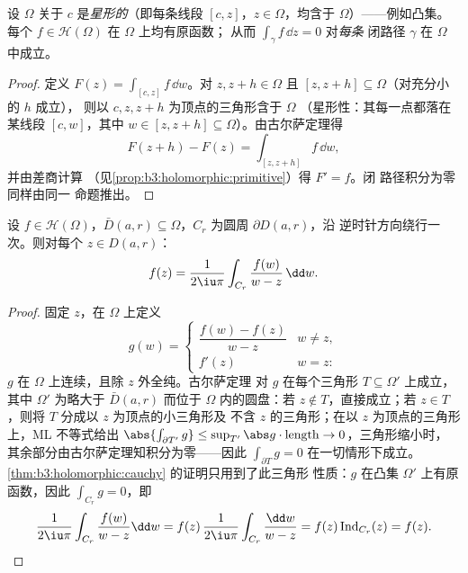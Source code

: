 \begin{theorem}
\label{thm:b3:holomorphic:cauchy}
设 $\Omega$ 关于 $c$ 是\emph{星形的}（即每条线段
$[c, z]$，$z \in \Omega$，均含于 $\Omega$）——例如凸集。
每个 $f \in \mathcal H(\Omega)$ 在 $\Omega$ 上均有原函数；
从而 $\int_\gamma f\,\dd z = 0$ 对\emph{每条}
闭路径 $\gamma$ 在 $\Omega$ 中成立。
\end{theorem}

\begin{proof}
定义 $F(z) = \int_{[c,z]}f\,\dd w$。对 $z, z + h \in
\Omega$ 且 $[z, z+h] \subseteq \Omega$（对充分小的 $h$ 成立），
则以 $c, z, z+h$ 为顶点的三角形含于 $\Omega$
（星形性：其每一点都落在某线段 $[c,
w]$，其中 $w \in [z, z+h] \subseteq \Omega$）。由古尔萨定理得
\[
F(z + h) - F(z) = \int_{[z, z+h]}f\,\dd w,
\]
并由差商计算
（见\cref{prop:b3:holomorphic:primitive}）得 $F' = f$。闭
路径积分为零同样由同一
命题推出。
\end{proof}

\begin{theorem}[柯西积分公式]
\label{thm:b3:holomorphic:formula}
设 $f \in \mathcal H(\Omega)$，$\bar D(a, r) \subseteq
\Omega$，$C_r$ 为圆周 $\partial D(a,r)$，沿
逆时针方向绕行一次。则对每个 $z \in D(a, r)$：
\[
f(z) = \frac1{2\iu\pi}\int_{C_r}\frac{f(w)}{w - z}\,\dd w .
\]
\end{theorem}

\begin{proof}
固定 $z$，在 $\Omega$ 上定义
\[
g(w) = \begin{cases}
\dfrac{f(w) - f(z)}{w - z} & w \neq z,\\[4pt]
f'(z) & w = z :
\end{cases}
\]
$g$ 在 $\Omega$ 上连续，且除 $z$ 外全纯。古尔萨定理
对 $g$ 在每个三角形 $T \subseteq \Omega'$ 上成立，其中
$\Omega'$ 为略大于 $\bar D(a,r)$ 而位于
$\Omega$ 内的圆盘：若 $z \notin T$，直接成立；若 $z \in T$，则将 $T$
分成以 $z$ 为顶点的小三角形及
不含 $z$ 的三角形；在以 $z$ 为顶点的三角形上，ML 不等式给出
$\abs{\int_{\partial T'}g} \leq \sup_{T'}\abs
g\cdot\operatorname{length} \to 0$，三角形缩小时，
其余部分由古尔萨定理知积分为零——因此
$\int_{\partial T}g = 0$ 在一切情形下成立。
\cref{thm:b3:holomorphic:cauchy} 的证明只用到了此三角形
性质：$g$ 在凸集 $\Omega'$ 上有原函数，因此
$\int_{C_r}g = 0$，即
\[
\frac1{2\iu\pi}\int_{C_r}\frac{f(w)}{w - z}\dd w
= f(z)\,\frac{1}{2\iu\pi}\int_{C_r}\frac{\dd w}{w - z}
= f(z)\operatorname{Ind}_{C_r}(z) = f(z) .
\]
\end{proof}

